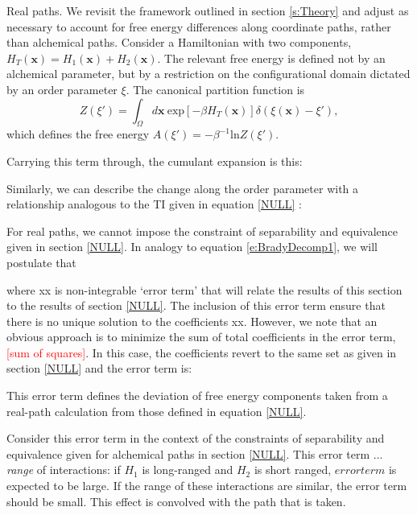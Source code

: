 \documentclass[%
 preprint,
 amsmath,amssymb,
 aps,
]{revtex4-1}
\newcommand{\warning}[1]{{\textsf{{\textcolor{red}{{[#1]}{}}}}}}
\renewcommand{\vec}[1]{{\mathbf{#1}}}
\begin{document}
 
 Real paths. We revisit the framework outlined in section \ref{s:Theory} and adjust as necessary to account for free energy differences along coordinate paths, rather than alchemical paths. Consider a Hamiltonian with two components, 
 $H_{T} \left( \vec{x} \right) = H_1 \left( \vec{x} \right) + H_2 \left( \vec{x} \right)$.  The relevant free energy is defined not by an alchemical parameter, but by a restriction on the configurational domain dictated by an order parameter $\xi$.  The canonical partition function is
 \begin{equation}
 Z \left( \xi' \right) = \int_{\Omega} d \vec{x}  \:  \mbox{exp} 
 \left[ -\beta H_T \left(\vec{x} \right) \right] 
 \delta \left( \xi \left( \vec{x} \right) - \xi'\right),
 \label{e:RealZ}
 \end{equation}
 which defines the free energy $A \left( \xi'\right) = -\beta^{-1} \mbox{ln} Z \left( \xi' \right)$. 
 
 Carrying this term through, the cumulant expansion is this:
 
 Similarly, we can describe the change along the order parameter with a relationship analogous to
 the TI given in equation \ref{NULL} \cite{NULL}: 
 
For real paths, we cannot impose the constraint of separability and equivalence given in section \ref{NULL}.  In analogy
to equation \ref{e:BradyDecomp1}, we will postulate that

where xx is non-integrable `error term' that will relate the
results of this section to the results of section \ref{NULL}.  The inclusion of this error term ensure that there is no 
unique solution to the coefficients xx.  However, we note that an obvious approach is to minimize the sum of total coefficients in the error term, \warning{sum of squares}.  In this case, the coefficients revert to the same set as given in section \ref{NULL} and the error term is:

This error term defines the deviation of free energy components taken from a real-path calculation from those defined in equation \ref{NULL}.  
 
 Consider this error term in the context of the constraints of separability and equivalence given for alchemical paths in section \ref{NULL}.  This error term ... \textit{range} of interactions:  if $H_1$ is long-ranged and $H_2$ is short ranged, $error term$ is expected to be large.  If the range of these interactions are similar, the error term should be small.  This 
 effect is convolved with the path that is taken. 
 
\end{document}
